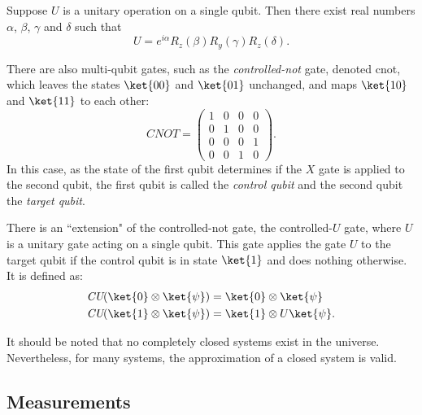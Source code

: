 \begin{theorem} \label{unitary} \cite{nielsen2010quantum}
  Suppose $U$ is a unitary operation on a single qubit. Then there exist real numbers $\alpha$, $\beta$, $\gamma$ and $\delta$ such that
  \begin{equation*}
    U = e^{i\alpha} R_{z}(\beta) R_{y}(\gamma) R_{z}(\delta).
  \end{equation*}
\end{theorem}

\begin{example}
  
There are also multi-qubit gates, such as the \emph{controlled-not} gate, denoted \gls{cnot}, which leaves the states $\ket{00}$ and  $\ket{01}$ unchanged, and maps $\ket{10}$ and $\ket{11}$ to each other:
\begin{equation*}
  \textit{CNOT} = \begin{pmatrix} 1 & 0 & 0 & 0\\ 0 & 1 & 0 & 0\\ 0 & 0 & 0 & 1\\ 0 & 0 & 1 & 0 \end{pmatrix}.
\end{equation*}
In this case, as the state of the first qubit determines if the $X$ gate is applied to the second qubit, the first qubit is called the \emph{control qubit} and the second qubit the \emph{target qubit}. 

There is an ``extension" of the controlled-not gate, the controlled-$U$ gate, where $U$ is a unitary gate acting on a single qubit. This gate applies the gate $U$ to the target qubit if the control qubit is in state $\ket{1}$ and does nothing otherwise. It is defined as:
\begin{align*}
  &\textit{CU} (\ket{0} \otimes \ket{\psi}) = \ket{0} \otimes \ket{\psi}\\ 
  &\textit{CU} (\ket{1} \otimes \ket{\psi}) = \ket{1} \otimes U\ket{\psi}.
\end{align*}
\end{example}

It should be noted that no completely closed systems exist in the universe. Nevertheless, for many systems, the approximation of a closed system is valid.



\subsection{Measurements}


